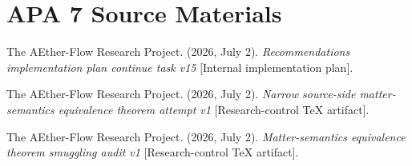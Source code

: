 \documentclass[11pt]{article}
\begin{document}
\section{APA 7 Source Materials}

The AEther-Flow Research Project. (2026, July 2). \textit{Recommendations
implementation plan continue task v15} [Internal implementation plan].

The AEther-Flow Research Project. (2026, July 2). \textit{Narrow source-side
matter-semantics equivalence theorem attempt v1} [Research-control TeX
artifact].

The AEther-Flow Research Project. (2026, July 2). \textit{Matter-semantics
equivalence theorem smuggling audit v1} [Research-control TeX artifact].
\end{document}
